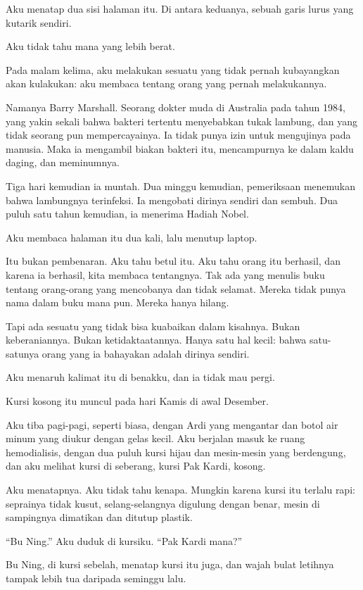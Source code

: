 \documentclass[11pt,twoside,openany]{book}
\makeatletter
\newcommand{\scenebreak}{\par\vspace{0.9em}{\centering\textsc{*\hspace{0.7em}*\hspace{0.7em}*}\par}\vspace{0.9em}\@afterindentfalse\@afterheading}
\makeatother
\begin{document}
Aku menatap dua sisi halaman itu. Di antara keduanya, sebuah garis lurus yang kutarik sendiri.

Aku tidak tahu mana yang lebih berat.

\scenebreak
Pada malam kelima, aku melakukan sesuatu yang tidak pernah kubayangkan akan kulakukan: aku membaca tentang orang yang pernah melakukannya.

Namanya Barry Marshall. Seorang dokter muda di Australia pada tahun 1984, yang yakin sekali bahwa bakteri tertentu menyebabkan tukak lambung, dan yang tidak seorang pun mempercayainya. Ia tidak punya izin untuk mengujinya pada manusia. Maka ia mengambil biakan bakteri itu, mencampurnya ke dalam kaldu daging, dan meminumnya.

Tiga hari kemudian ia muntah. Dua minggu kemudian, pemeriksaan menemukan bahwa lambungnya terinfeksi. Ia mengobati dirinya sendiri dan sembuh. Dua puluh satu tahun kemudian, ia menerima Hadiah Nobel.

Aku membaca halaman itu dua kali, lalu menutup laptop.

Itu bukan pembenaran. Aku tahu betul itu. Aku tahu orang itu berhasil, dan karena ia berhasil, kita membaca tentangnya. Tak ada yang menulis buku tentang orang-orang yang mencobanya dan tidak selamat. Mereka tidak punya nama dalam buku mana pun. Mereka hanya hilang.

Tapi ada sesuatu yang tidak bisa kuabaikan dalam kisahnya. Bukan keberaniannya. Bukan ketidaktaatannya. Hanya satu hal kecil: bahwa satu-satunya orang yang ia bahayakan adalah dirinya sendiri.

Aku menaruh kalimat itu di benakku, dan ia tidak mau pergi.

\scenebreak
Kursi kosong itu muncul pada hari Kamis di awal Desember.

Aku tiba pagi-pagi, seperti biasa, dengan Ardi yang mengantar dan botol air minum yang diukur dengan gelas kecil. Aku berjalan masuk ke ruang hemodialisis, dengan dua puluh kursi hijau dan mesin-mesin yang berdengung, dan aku melihat kursi di seberang, kursi Pak Kardi, kosong.

Aku menatapnya. Aku tidak tahu kenapa. Mungkin karena kursi itu terlalu rapi: seprainya tidak kusut, selang-selangnya digulung dengan benar, mesin di sampingnya dimatikan dan ditutup plastik.

``Bu Ning.'' Aku duduk di kursiku. ``Pak Kardi mana?''

Bu Ning, di kursi sebelah, menatap kursi itu juga, dan wajah bulat letihnya tampak lebih tua daripada seminggu lalu.
\end{document}
